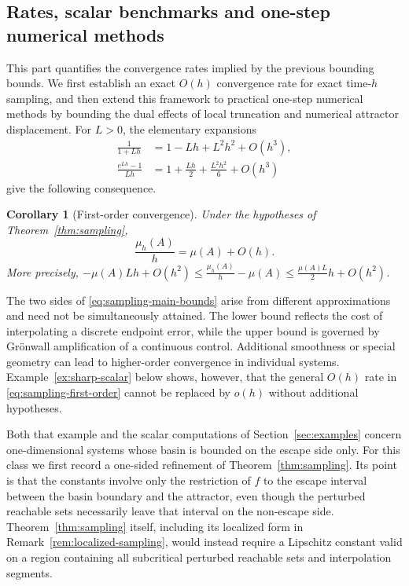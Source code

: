 \documentclass[pdflatex,sn-mathphys-num]{sn-jnl}
\numberwithin{equation}{section}
\theoremstyle{thmstyleone}%
\newtheorem{corollary}[theorem]{Corollary}
\theoremstyle{definition}
\theoremstyle{remark}
\begin{document}
\subsection{Rates, scalar benchmarks and one-step numerical methods}
\label{subsec:sampling-consequences}

This part quantifies the convergence rates implied by the previous bounding bounds. We first establish an exact $O(h)$ convergence rate for exact time-$h$ sampling, and then extend this framework to practical one-step numerical methods by bounding the dual effects of local truncation and numerical attractor displacement. 
For $L>0$, the elementary expansions
\begin{align}
\label{eq:lower-factor-expansion}
    \frac1{1+Lh}
    &=
    1-Lh+L^2h^2+O(h^3),\\
\label{eq:upper-factor-expansion}
    \frac{e^{Lh}-1}{Lh}
    &=
    1+\frac{Lh}{2}+\frac{L^2h^2}{6}+O(h^3)
\end{align}
give the following consequence.

\begin{corollary}[First-order convergence]
\label{cor:sampling-first-order}
Under the hypotheses of Theorem~\ref{thm:sampling},
\begin{equation}
\label{eq:sampling-first-order}
    \frac{\mu_h(A)}{h}
    =
    \mu(A)+O(h).
\end{equation}
More precisely,
    $-\mu(A)Lh+O(h^2)
    \leq
    \frac{\mu_h(A)}{h}-\mu(A)
    \leq
    \frac{\mu(A)L}{2}h+O(h^2)$.
\end{corollary}

The two sides of \eqref{eq:sampling-main-bounds} arise from different
approximations and need not be simultaneously attained. The lower
bound reflects the cost of interpolating a discrete endpoint error,
while the upper bound is governed by Gr\"onwall amplification of a
continuous control. Additional smoothness or special geometry can
lead to higher-order convergence in individual systems.
Example~\ref{ex:sharp-scalar} below shows, however, that the general
$O(h)$ rate in \eqref{eq:sampling-first-order} cannot be replaced by
$o(h)$ without additional hypotheses.

Both that example and the scalar computations of
Section~\ref{sec:examples} concern one-dimensional systems whose basin
is bounded on the escape side only. For this class we first record a
one-sided refinement of Theorem~\ref{thm:sampling}. Its point is that
the constants involve only the restriction of $f$ to the escape
interval between the basin boundary and the attractor, even though the
perturbed reachable sets necessarily leave that interval on the
non-escape side. Theorem~\ref{thm:sampling} itself, including its
localized form in Remark~\ref{rem:localized-sampling}, would instead
require a Lipschitz constant valid on a region containing all
subcritical perturbed reachable sets and interpolation segments.
\end{document}
